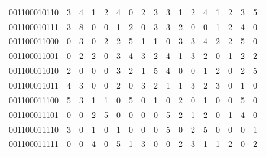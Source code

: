 \documentclass[10pt,a4paper]{article}
\begin{document}
\begin{longtable}{ |c|c|c|c|c|c|c|c|c|c|c|c|c|c|c|c|c| }
    001100010110              & 3                            & 4                                & 1                            & 2                              & 4   & 0   & 2   & 3   & 3   & 1   & 2   & 4   & 1   & 2   & 3   & 5   \\
    001100010111              & 3                            & 8                                & 0                            & 0                              & 1   & 2   & 0   & 3   & 3   & 2   & 0   & 0   & 1   & 2   & 4   & 0   \\
    001100011000              & 0                            & 3                                & 0                            & 2                              & 2   & 5   & 1   & 1   & 0   & 3   & 3   & 4   & 2   & 2   & 5   & 0   \\
    001100011001              & 0                            & 2                                & 2                            & 0                              & 3   & 4   & 3   & 2   & 4   & 1   & 3   & 2   & 0   & 1   & 2   & 2   \\
    001100011010              & 2                            & 0                                & 0                            & 0                              & 3   & 2   & 1   & 5   & 4   & 0   & 0   & 1   & 2   & 0   & 2   & 5   \\
    001100011011              & 4                            & 3                                & 0                            & 0                              & 2   & 0   & 3   & 2   & 1   & 1   & 3   & 2   & 3   & 0   & 1   & 0   \\
    001100011100              & 5                            & 3                                & 1                            & 1                              & 0   & 5   & 0   & 1   & 0   & 2   & 0   & 1   & 0   & 0   & 5   & 0   \\
    001100011101              & 0                            & 0                                & 2                            & 5                              & 0   & 0   & 0   & 0   & 5   & 2   & 1   & 2   & 0   & 1   & 4   & 0   \\
    001100011110              & 3                            & 0                                & 1                            & 0                              & 1   & 0   & 0   & 0   & 5   & 0   & 2   & 5   & 0   & 0   & 0   & 1   \\
    001100011111              & 0                            & 0                                & 4                            & 0                              & 5   & 1   & 3   & 0   & 0   & 2   & 3   & 1   & 1   & 2   & 0   & 2   \\

\end{longtable}
\end{document}
